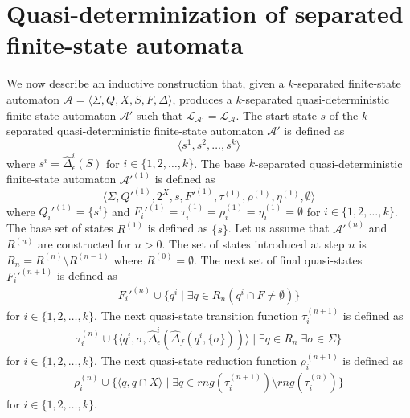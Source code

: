 \section{Quasi-determinization of separated finite-state automata}

We now describe an inductive construction that, given a $k$-separated finite-state
automaton $\mathcal{A} = \langle \Sigma, Q, X, S, F, \Delta \rangle$, produces a
$k$-separated quasi-deterministic finite-state automaton $\mathcal{A}'$ such that
$\mathcal{L}_{\mathcal{A}'} = \mathcal{L}_\mathcal{A}$.
The start state $s$ of the $k$-separated quasi-deterministic finite-state automaton
$\mathcal{A}'$ is defined as
\begin{equation*}
  \langle s^1, s^2, \ldots, s^k \rangle
\end{equation*}
where $s^i = \hat{\Delta}_\epsilon^i(S)$ for $i \in \{ 1, 2, \ldots, k \}$.
The base $k$-separated quasi-deterministic finite-state automaton
$\mathcal{A}'^{(1)}$ is defined as
\begin{equation*}
  \langle \Sigma, Q'^{(1)}, 2^X, s, F'^{(1)}, \tau^{(1)}, \rho^{(1)}, \eta^{(1)},
  \emptyset \rangle
\end{equation*}
where $Q_i'^{(1)} = \{ s^i \}$ and $F_i'^{(1)} = \tau_i^{(1)} = \rho_i^{(1)} =
\eta_i^{(1)} = \emptyset$ for $i \in \{ 1, 2, \ldots, k \}$.
The base set of states $R^{(1)}$ is defined as $\{ s \}$.
Let us assume that $\mathcal{A}'^{(n)}$ and $R^{(n)}$ are constructed for $n > 0$.
The set of states introduced at step $n$ is $R_n = R^{(n)} \setminus R^{(n-1)}$ where
$R^{(0)} = \emptyset$.
The next set of final quasi-states $F_i'^{(n+1)}$ is defined as
\begin{align*}
  F_i'^{(n)} \cup \{ q^i \mid \exists q \in R_n(q^i \cap F \neq \emptyset) \}
\end{align*}
for $i \in \{ 1, 2, \ldots, k \}$.
The next quasi-state transition function $\tau_i^{(n+1)}$ is defined as
\begin{align*}
  \tau_i^{(n)} \cup \{ \langle q^i, \sigma,
  \hat{\Delta}_\epsilon^i(\hat{\Delta}_f(q^i, \{ \sigma \})) \rangle \mid \exists q
  \in R_n \; \exists \sigma \in \Sigma \}
\end{align*}
for $i \in \{ 1, 2, \ldots, k \}$.
The next quasi-state reduction function $\rho_i^{(n+1)}$ is defined as
\begin{align*}
  \rho_i^{(n)} \cup \{ \langle q, q \cap X \rangle \mid \exists q \in
  rng(\tau_i^{(n+1)}) \setminus rng(\tau_i^{(n)}) \}
\end{align*}
for $i \in \{ 1, 2, \ldots, k \}$.
